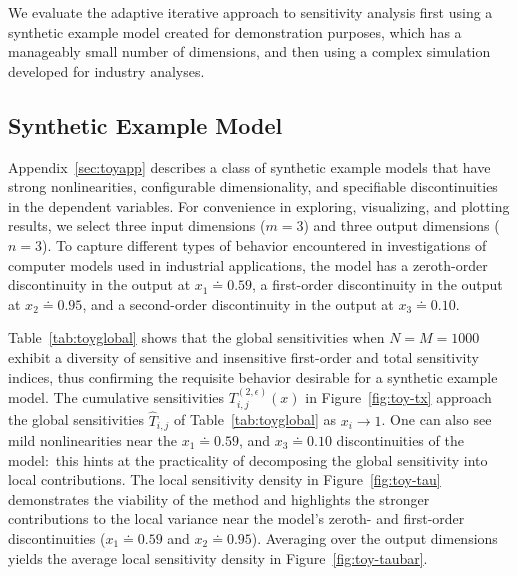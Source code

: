 \documentclass[12pt]{article}
\begin{document}
We evaluate the adaptive iterative approach to sensitivity analysis first using a synthetic example model created for demonstration purposes, which has a manageably small number of dimensions, and then using a complex simulation developed for industry analyses.


\subsection{Synthetic Example Model}
\label{sec:toy}

Appendix~\ref{sec:toyapp} describes a class of synthetic example models that have strong nonlinearities, configurable dimensionality, and specifiable discontinuities in the dependent variables. For convenience in exploring, visualizing, and plotting results, we select three input dimensions ($m = 3$) and three output dimensions ($n = 3$). To capture different types of behavior encountered in investigations of computer models used in industrial applications, the model has a zeroth-order discontinuity in the output at $x_1 \doteq 0.59$, a first-order discontinuity in the output at $x_2 \doteq 0.95$, and a second-order discontinuity in the output at $x_3 \doteq 0.10$.

Table~\ref{tab:toyglobal} shows that the global sensitivities when $N = M = 1000$ exhibit a diversity of sensitive and insensitive first-order and total sensitivity indices, thus confirming the requisite behavior desirable for a synthetic example model. The cumulative sensitivities $T_{i,j}^{(2,\epsilon)}(x)$ in Figure~\ref{fig:toy-tx} approach the global sensitivities $\hat{T}_{i,j}$ of Table~\ref{tab:toyglobal} as $x_i \rightarrow 1$. One can also see mild nonlinearities near the $x_1 \doteq 0.59$, and $x_3 \doteq 0.10$ discontinuities of the model:\ this hints at the practicality of decomposing the global sensitivity into local contributions. The local sensitivity density in Figure~\ref{fig:toy-tau} demonstrates the viability of the method and highlights the stronger contributions to the local variance near the model's zeroth- and first-order discontinuities ($x_1 \doteq 0.59$ and $x_2 \doteq 0.95$). Averaging over the output dimensions yields the average local sensitivity density in Figure~\ref{fig:toy-taubar}.
\end{document}
